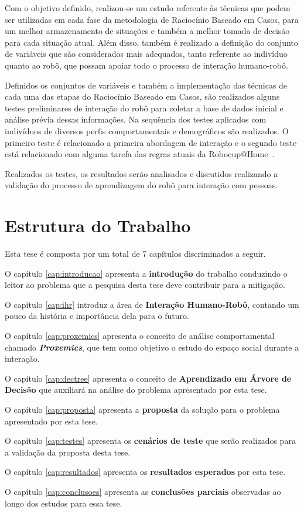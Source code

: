 Com o objetivo definido, realizou-se um estudo referente às técnicas que podem ser utilizadas em cada fase da metodologia de Raciocínio Baseado em Casos, para um melhor armazenamento de situações e também a melhor tomada de decisão para cada situação atual. Além disso, também é realizado a definição do conjunto de variáveis que são considerados mais adequados, tanto referente ao indivíduo quanto ao robô, que possam apoiar todo o processo de interação humano-robô.

Definidos os conjuntos de variáveis e também a implementação das técnicas de cada uma das etapas do Raciocínio Baseado em Casos, são realizados alguns testes preliminares de interação do robô para coletar a base de dados inicial e análise prévia dessas informações. Na sequência dos testes aplicados com indivíduos de diversos perfis comportamentais e demográficos são realizados. O primeiro teste é relacionado a primeira abordagem de interação e o segundo teste está relacionado com alguma tarefa das regras atuais da Robocup@Home~\cite{Robocup:2015}.

Realizados os testes, os resultados serão analisados e discutidos realizando a validação do processo de aprendizagem do robô para interação com pessoas.

\section{Estrutura do Trabalho}
Esta tese é composta por um total de 7 capítulos discriminados a seguir.

O capítulo \ref{cap:introducao} apresenta a \textbf{introdução} do trabalho conduzindo o leitor ao problema que a pesquisa desta tese deve contribuir para a mitigação.

O capítulo \ref{cap:ihr} introduz a área de \textbf{Interação Humano-Robô}, contando um pouco da história e importância dela para o futuro.

O capítulo \ref{cap:proxemics} apresenta o conceito de análise comportamental chamado \emph{\textbf{Proxemics}}, que tem como objetivo o estudo do espaço social durante a interação.

O capítulo \ref{cap:dectree} apresenta o conceito de \textbf{Aprendizado em Árvore de Decisão} que auxiliará na análise do problema apresentado por esta tese.

O capítulo \ref{cap:proposta} apresenta a \textbf{proposta} da solução para o problema apresentado por esta tese.

O capítulo \ref{cap:testes} apresenta os \textbf{cenários de teste} que serão realizados para a validação da proposta desta tese.

O capítulo \ref{cap:resultados} apresenta os \textbf{resultados esperados} por esta tese.

O capítulo \ref{cap:conclusoes} apresenta as \textbf{conclusões parciais} observadas ao longo dos estudos para essa tese.
